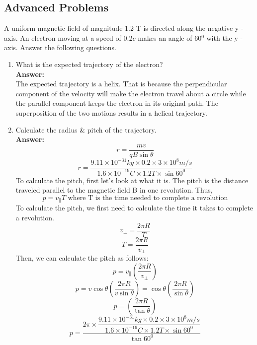 \documentclass[9pt,addpoints]{exam}
\begin{document}
\begin{questions}
		\subsection*{Advanced Problems}
		\question A uniform magnetic field of magnitude 1.2 T is directed along the negative y - axis. An electron moving at a speed of 0.2$c$ makes an angle of 60$^0$ with the y - axis. Answer the following questions.
		\begin{enumerate}[label=(\Roman*)]
			\item What is the expected trajectory of the electron? \\ \textbf{Answer:} \\ 
			The expected trajectory is a helix. That is because the perpendicular component of the velocity will make the electron travel about a circle while the parallel component keeps the electron in its original path. The superposition of the two motions results in a helical trajectory.
			\item Calculate the radius \& pitch of the trajectory. \\ \textbf{Answer:} \\ 
			$$r=\dfrac{mv}{qB\sin\theta}$$
			$$r=\dfrac{9.11\times10^{-31}kg\times0.2\times3\times10^8m/s}{1.6\times10^{-19}C\times1.2T\times\sin60^0}$$
			To calculate the pitch, first let's look at what it is. The pitch is the distance traveled parallel to the magnetic field B in one revolution. Thus,
			$$p=v_{\parallel}T\text{ where T is the time needed to complete a revolution}$$ 
			To calculate the pitch, we first need to calculate the time it takes to complete a revolution.
			$$v_{\perp}=\dfrac{2\pi R}{T}$$
			$$T=\dfrac{2\pi R}{v_{\perp}}$$
			Then, we can calculate the pitch as follows:
			$$p=v_{\parallel}(\dfrac{2\pi R}{v_{\perp}})$$
			$$p=v\cos\theta(\dfrac{2\pi R}{v\sin\theta})=\cos\theta(\dfrac{2\pi R}{\sin\theta})$$
			$$p=(\dfrac{2\pi R}{\tan\theta})$$
			$$p=\dfrac{2\pi\times\dfrac{9.11\times10^{-31}kg\times0.2\times3\times10^8m/s}{1.6\times10^{-19}C\times1.2T\times\sin60^0}}{\tan 60^0}$$
		\end{enumerate}
	\end{questions}		
\end{document}
